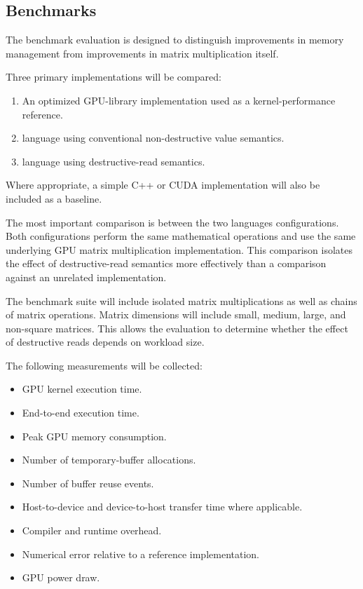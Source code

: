 \documentclass[a4paper]{article}
\begin{document}
	
	\subsection{Benchmarks}
	
	The benchmark evaluation is designed to distinguish improvements in memory management from improvements in matrix multiplication itself.
	
	Three primary implementations will be compared:
	
	\begin{enumerate}
		\item An optimized GPU-library implementation used as a kernel-performance reference.
		\item language using conventional non-destructive value semantics.
		\item language using destructive-read semantics.
	\end{enumerate}
	
	Where appropriate, a simple C++ or CUDA implementation will also be included as a baseline.
	
	The most important comparison is between the two languages configurations. Both configurations perform the same mathematical operations and use the same underlying GPU matrix multiplication implementation. This comparison isolates the effect of destructive-read semantics more effectively than a comparison against an unrelated implementation.
	
	The benchmark suite will include isolated matrix multiplications as well as chains of matrix operations. Matrix dimensions will include small, medium, large, and non-square matrices. This allows the evaluation to determine whether the effect of destructive reads depends on workload size.
	
	The following measurements will be collected:
	
	\begin{itemize}
		\item GPU kernel execution time.
		\item End-to-end execution time.
		\item Peak GPU memory consumption.
		\item Number of temporary-buffer allocations.
		\item Number of buffer reuse events.
		\item Host-to-device and device-to-host transfer time where applicable.
		\item Compiler and runtime overhead.
		\item Numerical error relative to a reference implementation.
		\item GPU power draw.
	\end{itemize}
	
\end{document}
